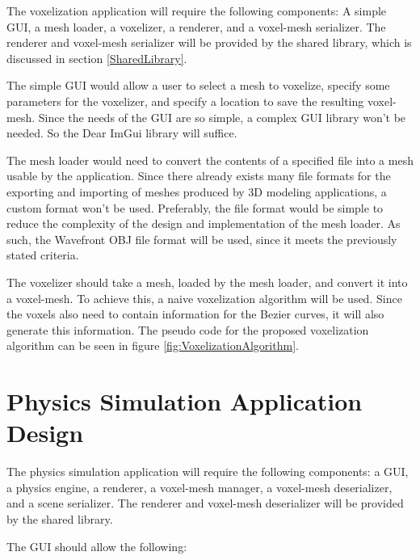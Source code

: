 The voxelization application will require the following components: A simple GUI, a mesh loader,
a voxelizer, a renderer, and a voxel-mesh serializer. The renderer and voxel-mesh serializer will 
be provided by the shared library, which is discussed in section \ref{SharedLibrary}. 

The simple GUI would allow a user to select a mesh to voxelize, specify some parameters for the 
voxelizer, and specify a location to save the resulting voxel-mesh. Since the needs of the GUI are 
so simple, a complex GUI library won't be needed. So the Dear ImGui library will suffice.

The mesh loader would need to convert the contents of a specified file into a mesh usable by the
application. Since there already exists many file formats for the exporting and importing of meshes
produced by 3D modeling applications, a custom format won't be used. Preferably, the file format 
would be simple to reduce the complexity of the design and implementation of the mesh loader. As
such, the Wavefront OBJ file format will be used, since it meets the previously stated criteria.

The voxelizer should take a mesh, loaded by the mesh loader, and convert it into a voxel-mesh. To
achieve this, a naive voxelization algorithm will be used. Since the voxels also need to contain
information for the Bezier curves, it will also generate this information. The pseudo code for the 
proposed voxelization algorithm can be seen in figure \ref{fig:VoxelizationAlgorithm}.



\section{Physics Simulation Application Design}

The physics simulation application will require the following components: a GUI, a physics 
engine, a renderer, a voxel-mesh manager, a voxel-mesh deserializer, and a scene serializer. The 
renderer and voxel-mesh deserializer will be provided by the shared library.

The GUI should allow the following:


